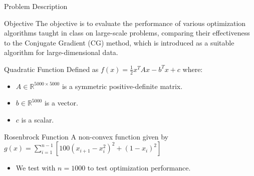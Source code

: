 \documentclass{beamer}
\begin{document}
\begin{frame}{Problem Description}
  \footnotesize 

  \begin{block}{Objective}
    The objective is to evaluate the performance of various optimization algorithms taught in class on large-scale problems, comparing their effectiveness to the Conjugate Gradient (CG) method, which is introduced as a suitable algorithm for large-dimensional data.
  \end{block}
  
  \begin{block}{Quadratic Function}
    Defined as \( f(x) = \frac{1}{2} x^T A x - b^T x + c \) where:
    \begin{itemize}
      \item \( A \in \mathbb{R}^{5000 \times 5000} \) is a symmetric positive-definite matrix.
      \item \( b \in \mathbb{R}^{5000} \) is a vector.
      \item \( c \) is a scalar.
    \end{itemize}
  \end{block}
  
  \begin{block}{Rosenbrock Function}
    A non-convex function given by \( g(x) = \sum_{i=1}^{n-1} [100(x_{i+1} - x_i^2)^2 + (1 - x_i)^2] \)
    \begin{itemize}
      \item We test with \( n = 1000 \) to test optimization performance.
    \end{itemize}
  \end{block}
\end{frame}
\end{document}
